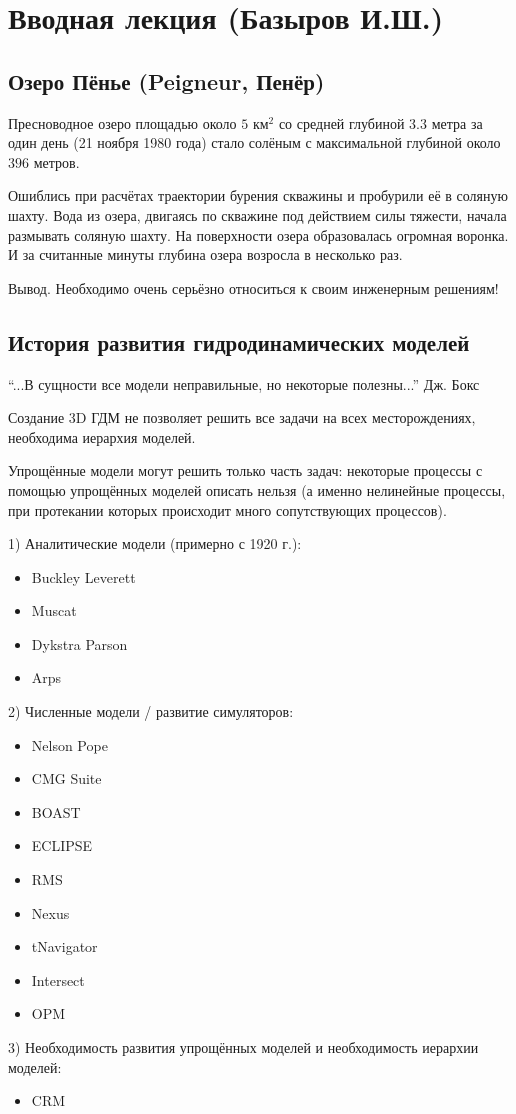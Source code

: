 \documentclass[main.tex]{subfiles}
\begin{document}

\section{Вводная лекция (Базыров И.Ш.)}

\subsection{Озеро Пёнье (Peigneur, Пенёр)}

Пресноводное озеро площадью около $5\text{ км}^2$ со средней глубиной $3.3$ метра за один день (21 ноября 1980 года) стало солёным с максимальной глубиной около $396$ метров.

Ошиблись при расчётах траектории бурения скважины и пробурили её в соляную шахту. 
Вода из озера, двигаясь по скважине под действием силы тяжести, начала размывать соляную шахту.
На поверхности озера образовалась огромная воронка. И за считанные минуты глубина озера возросла в несколько раз.

Вывод. Необходимо очень серьёзно относиться к своим инженерным решениям!

\subsection{История развития гидродинамических моделей}

\enquote{...В сущности все модели неправильные, но некоторые полезны...} Дж. Бокс

Создание 3D ГДМ не позволяет решить все задачи на всех месторождениях, необходима иерархия моделей.

Упрощённые модели могут решить только часть задач: некоторые процессы с помощью упрощённых моделей описать нельзя (а именно нелинейные процессы, при протекании которых происходит много сопутствующих процессов).

1) Аналитические модели (примерно с 1920 г.):
\begin{itemize}
	\item Buckley Leverett
	\item Muscat
	\item Dykstra Parson
	\item Arps
\end{itemize}
2) Численные модели / развитие симуляторов:
\begin{itemize}
	\item Nelson Pope
	\item CMG Suite
	\item BOAST
	\item ECLIPSE
	\item RMS
	\item Nexus
	\item tNavigator
	\item Intersect
	\item OPM
\end{itemize}
3) Необходимость развития упрощённых моделей и необходимость иерархии моделей:
\begin{itemize}
	\item CRM
\end{itemize}
\end{document}
